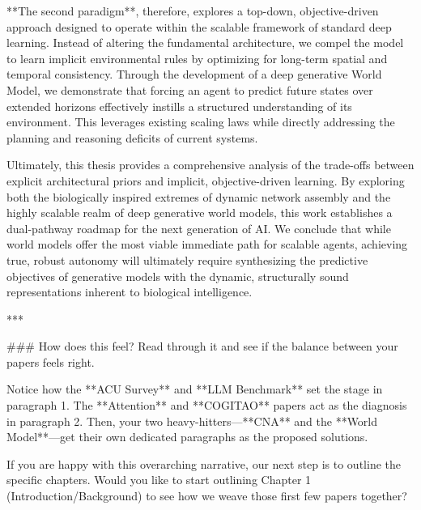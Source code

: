 **The second paradigm**, therefore, explores a top-down, objective-driven approach designed to operate within the scalable framework of standard deep learning. Instead of altering the fundamental architecture, we compel the model to learn implicit environmental rules by optimizing for long-term spatial and temporal consistency. Through the development of a deep generative World Model, we demonstrate that forcing an agent to predict future states over extended horizons effectively instills a structured understanding of its environment. This leverages existing scaling laws while directly addressing the planning and reasoning deficits of current systems.

Ultimately, this thesis provides a comprehensive analysis of the trade-offs between explicit architectural priors and implicit, objective-driven learning. By exploring both the biologically inspired extremes of dynamic network assembly and the highly scalable realm of deep generative world models, this work establishes a dual-pathway roadmap for the next generation of AI. We conclude that while world models offer the most viable immediate path for scalable agents, achieving true, robust autonomy will ultimately require synthesizing the predictive objectives of generative models with the dynamic, structurally sound representations inherent to biological intelligence.

***

### How does this feel?
Read through it and see if the balance between your papers feels right. 

Notice how the **ACU Survey** and **LLM Benchmark** set the stage in paragraph 1. The **Attention** and **COGITAO** papers act as the diagnosis in paragraph 2. Then, your two heavy-hitters—**CNA** and the **World Model**—get their own dedicated paragraphs as the proposed solutions. 

If you are happy with this overarching narrative, our next step is to outline the specific chapters. Would you like to start outlining Chapter 1 (Introduction/Background) to see how we weave those first few papers together?
